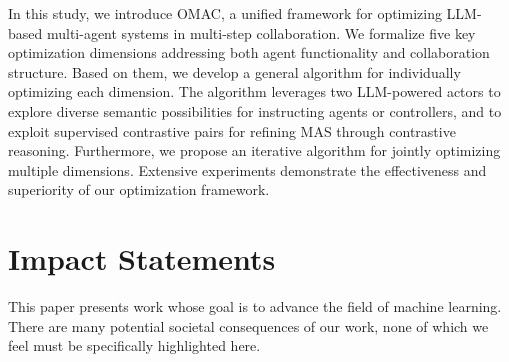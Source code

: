 \documentclass{article} %
\begin{document}


In this study, we introduce OMAC, a unified framework for optimizing LLM-based multi-agent systems in multi-step collaboration. We formalize five key optimization dimensions addressing both agent functionality and collaboration structure. Based on them, we develop a general algorithm for individually optimizing each dimension. The algorithm leverages two LLM-powered actors to explore diverse semantic possibilities for instructing agents or controllers, and to exploit supervised contrastive pairs for refining MAS through contrastive reasoning. Furthermore, we propose an iterative algorithm for jointly optimizing multiple dimensions. Extensive experiments demonstrate the effectiveness and superiority of our optimization framework. 









\section*{Impact Statements}


This paper presents work whose goal is to advance the field of machine learning. There are many potential societal consequences of our work, none of which we feel must be specifically highlighted here.


% 





\clearpage
\appendix
\onecolumn



\newpage

\newpage

% 
\end{document}
